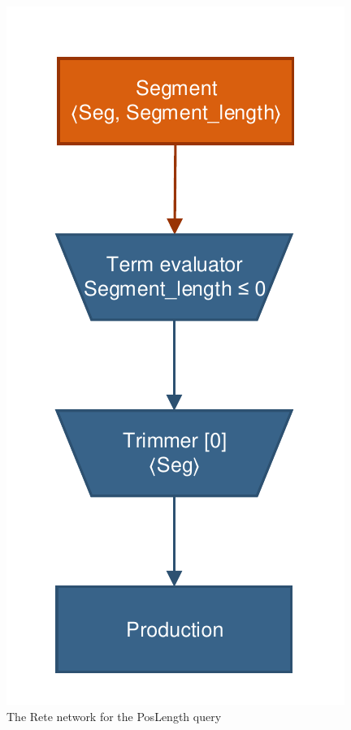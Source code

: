 \begin{figure}[Htb]
\begin{center}
\includegraphics[scale=0.5]{figures/rete-poslength-layout.pdf}
\caption{The Rete network for the \textsf{PosLength} query} 
\label{fig:rete-poslength-layout}
\end{center}
\end{figure}


